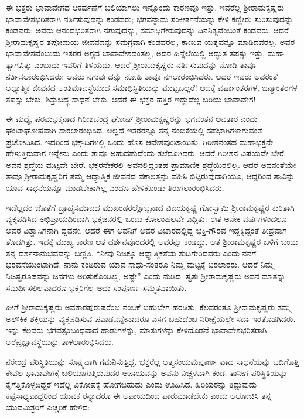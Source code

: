 ಈ ಭಕ್ತರು ಭಾವಾವೇಗದ ಆಕರ್ಷಣೆಗೆ ಬಲಿಯಾಗಲು ಇನ್ನೊಂದು ಕಾರಣವೂ ಇತ್ತು. ಇವರೆಲ್ಲ ಶ್ರೀರಾಮಕೃಷ್ಣರು ಭಾವಾವೇಶಭರಿತರಾಗಿ ನರ್ತಿಸುವುದನ್ನು ಕಂಡವರು; ಭಗವನ್ನಾಮ ಸಂಕೀರ್ತನೆಯನ್ನು ಕೇಳಿ ಕಣ್ಣೀರು ಸುರಿಸುವುದನ್ನು ಕಂಡವರು; ಅವರು ಆನಂದಭರಿತರಾಗಿ ನಗುವುದನ್ನು, ಸಮಾಧಿಗೇರುವುದನ್ನು ದಿನನಿತ್ಯವೆಂಬಂತೆ ಕಂಡವರು. ಆದರೆ ಶ್ರೀರಾಮಕೃಷ್ಣರ ತಪೋಮಯ ಜೀವನವನ್ನು ಸಮಗ್ರವಾಗಿ ಕಂಡವರಲ್ಲ, ಕಾಣುವ ಯತ್ನವನ್ನೂ ಮಾಡಿದವರಲ್ಲ. ಅವರ ಭಾವಾವೇಶವೆಂಬುದು ಇತರರ ಅಗ್ಗದ ಭಾವಾವೇಶದಂತಲ್ಲ, ಅದರ ಹಿನ್ನೆಲೆಯಲ್ಲಿ ಅದ್ಭುತ ತಪಸ್ಸು ಇತ್ತು, ಮಹಾ ತ್ಯಾಗವಿತ್ತು ಎಂಬುದು ಇವರಿಗೆ ತಿಳಿಯದು. ಆದರೆ ಶ್ರೀರಾಮಕೃಷ್ಣರು ನರ್ತಿಸುವುದನ್ನು ನೋಡಿ ತಾವೂ ನರ್ತಿಸಲಾರಂಭಿಸಿದರು; ಅವರು ನಗುವು ದನ್ನು ನೋಡಿ ತಾವೂ ನಗಲಾರಂಭಿಸಿದರು. ಆದರೆ ಇವರು ಅವರಂತೆ ಆಧ್ಯಾತ್ಮಿಕ ಜೀವನದ ಅಂತಿಮಾವಸ್ಥೆಯಾದ ಸಮಾಧಿಸ್ಥಿತಿಯನ್ನು ಮುಟ್ಟಬಲ್ಲರೆ! ಅದಕ್ಕೆ ವರ್ಷಾಂತರಗಳ, ಜನ್ಮಾಂತರಗಳ ತಪಸ್ಸು ಬೇಕು, ಶಿಸ್ತುಬದ್ಧ ಸಾಧನೆ ಬೇಕು. ಆದರೆ ಈ ಭಕ್ತರ ಹತ್ತಿರ ಇದ್ದುದೆಲ್ಲ ಬರಿಯ ಭಾವಾವೇಗ!

ಈ ಮಧ್ಯೆ, ಪರಮಭಕ್ತನಾದ ಗಿರೀಶಚಂದ್ರ ಘೋಷ್ ಶ್ರೀರಾಮಕೃಷ್ಣರನ್ನು ಭಗವಂತನ ಅವತಾರ ಎಂದು ಘಂಟಾಘೋಷವಾಗಿ ಸಾರಲಾರಂಭಿಸಿದ. ಅಲ್ಲದೆ ಇತರರನ್ನೂ ತನ್ನ ನಂಬಿಕೆಯಲ್ಲಿ ಸಹಭಾಗಿಗಳಾಗುವಂತೆ ಪ್ರಚೋದಿಸಿದ. ಇದರಿಂದ ಭಕ್ತಾದಿಗಳಲ್ಲಿ ಒಂದು ಹೊಸ ಆವೇಶವುಂಟಾಯಿತು. ಗಿರೀಶನಂತಹ ಮಹಾಭಕ್ತನೇ ಹೇಳುತ್ತಿರುವಾಗ ಇನ್ನೇನು ಎಂದು ತಾವೂ ಅಹುದಹುದೆಂದು ತಲೆದೂಗಿದರು. ಆದರೆ ಗಿರೀಶನ ವಿಷಯವೇ ಬೇರೆ. ಅವನ ಶ್ರದ್ಧೆಯ ಮಟ್ಟವೇ ಬೇರೆ. ಭಕ್ತರನೇಕರಲ್ಲಿ ಅವನಲ್ಲಿದ್ದಂತಹ ಪ್ರಾಮಾಣಿಕ ಶ್ರದ್ಧೆಯಿರಲಿಲ್ಲ. ಆದರೆ ಅವನಂತೆಯೇ ತಾವೂ ಶ್ರೀರಾಮಕೃಷ್ಣರಿಗೆ ತಮ್ಮ ಆಧ್ಯಾತ್ಮಿಕ ಜೀವನದ ವಕಾಲತ್ತನ್ನು ವಹಿಸಿ ಬಿಟ್ಟಿರುವುದಾಗಿಯೂ, ಆದ್ದರಿಂದ ತಾವಿನ್ನು ಯಾವ ಸಾಧನೆಯನ್ನೂ ಮಾಡಬೇಕಾಗಿಲ್ಲ ಎಂದೂ ಹೇಳಿಕೊಂಡು ತಿರುಗಲಾರಂಭಿಸಿದರು.

ಇದೆಲ್ಲದರ ಜೊತೆಗೆ ಬ್ರಾಹ್ಮಸಮಾಜದ ಮುಖಂಡರಲ್ಲೊಬ್ಬನಾದ ವಿಜಯಕೃಷ್ಣ ಗೋಸ್ವಾಮಿ ಶ್ರೀರಾಮಕೃಷ್ಣರ ಕುರಿತಾಗಿ ವ್ಯಕ್ತಪಡಿಸಿದ ಅಭಿಪ್ರಾಯದಿಂದಾಗಿ ಭಕ್ತಜನರಲ್ಲಿ ಒಂದು ಕೋಲಾಹಲವೇ ಎದ್ದಿತು. ಈತ ಅನೇಕ ವರ್ಷಗಳಿಂದಲೂ ಅವರ ವಿಶ್ವಾಸಿಗನಾಗಿ ದ್ದವನೇ. ಆದರೆ ಈಗ ಅವನಿಗೆ ಅವರ ವಿಚಾರದಲ್ಲಿದ್ದ ಭಕ್ತಿ-ಗೌರವ ಇದ್ದಕ್ಕಿದ್ದಂತೆ ತೀವ್ರವಾಗ ತೊಡಗಿತ್ತು. ಇದಕ್ಕೆ ಮುಖ್ಯ ಕಾರಣ ಆತ ದರ್ಶನವೊಂದರಲ್ಲಿ ಅವರನ್ನು ಕಂಡದ್ದು. ಆತ ಶ್ರೀರಾಮಕೃಷ್ಣರ ಬಳಿಗೆ ಬಂದು ತನ್ನ ದರ್ಶನಾನುಭವವನ್ನು ಬಣ್ಣಿಸಿ, “ನೀವು ನಿಜಕ್ಕೂ ಆಧ್ಯಾತ್ಮಿಕತೆಯ ತುದಿಗೇರಿದವರು ಎಂದು ನನಗೆ ಭರವಸೆಯುಂಟಾಗಿದೆ. ನಾನು ಕಂಡಿರುವ ಯಾವ ಸಾಧು-ಸಂತರೂ ನಿಮ್ಮ ಮಟ್ಟಕ್ಕೆ ಬರಲಾರರು. ಆದರೆ ನಿಮ್ಮ ನಿಜಸ್ವರೂಪವನ್ನು ಜನಗಳು ಅರಿತುಕೊಂಡಿಲ್ಲ, ಅಷ್ಟೇ” ಎಂದು ನುಡಿದ. ಸ್ವತಃ ಶ್ರೀರಾಮಕೃಷ್ಣರು ಅವನ ಮಾತನ್ನು ಸಮರ್ಥಿಸಲಿಲ್ಲವಾದರೂ ಭಕ್ತರಿಗೆಲ್ಲ ಅದು ಸಂಪೂರ್ಣ ಸಮ್ಮತವಾಯಿತು.

ಹೀಗೆ ಶ್ರೀರಾಮಕೃಷ್ಣರು ಅವತಾರಪುರುಷರೆಂಬ ನಂಬಿಕೆ ಬಹುಬೇಗ ಹರಡಿತು. ಕೆಲವರಂತೂ ಶ್ರೀರಾಮಕೃಷ್ಣರು ತಮ್ಮ ಅಲೌಕಿಕ ಶಕ್ತಿಯನ್ನು ವ್ಯಕ್ತಪಡಿಸುವ ಪವಾಡವನ್ನೇನಾದರೂ ಎಸಗ ಬಹುದೆಂಬ ನಿರೀಕ್ಷೆಯಲ್ಲೇ ಸದಾ ಇರತೊಡಗಿದರು. ಇನ್ನು ಕೆಲವರು ಭಗವತ್ಸಂಬಂಧವಾದ ಹಾಡುಗಳನ್ನು, ಮಾತುಗಳನ್ನು ಕೇಳಿದೊಡನೆ ಭಾವಾವೇಶಭರಿತರಾಗಿ ಅರೆಪ್ರಜ್ಞಾವಸ್ಥೆಯನ್ನು ತಾಳಲಾರಂಭಿಸಿದರು.

ನರೇಂದ್ರ ಪರಿಸ್ಥಿತಿಯನ್ನು ಸೂಕ್ಷ್ಮವಾಗಿ ಗಮನಿಸುತ್ತಿದ್ದ. ಭಕ್ತರೆಲ್ಲ ಆತ್ಮಸಂಯಮಪೂರ್ಣ ವಾದ ಸಾಧನೆಯನ್ನು ಬದಿಗೊತ್ತಿ ಕೇವಲ ಭಾವಾವೇಗಕ್ಕೆ ಬಲಿಯಾಗುತ್ತಿರುವುದರ ಅಪಾಯವನ್ನು ಅವನು ನಿಚ್ಚಳವಾಗಿ ಕಂಡ. ತಾನೀಗ ಪರಿಸ್ಥಿತಿಯನ್ನು ಕೈಗೆತ್ತಿಕೊಳ್ಳದಿದ್ದರೆ ಇದೆಲ್ಲ ವಿಕೋಪಕ್ಕೆ ಹೋಗಬಹುದು ಎಂದು ಊಹಿಸಿದ. ಹಿರಿಯರನ್ನು ತಿದ್ದುವುದು ಕಷ್ಟಸಾಧ್ಯವಾದ್ದರಿಂದ ಯುವಕ ರನ್ನಾದರೂ ಈ ಅಪಾಯದಿಂದ ಪಾರುಮಾಡಬೇಕು ಎಂದು ಆಲೋಚಿಸಿ ತನ್ನ ಯುವಮಿತ್ರರಿಗೆ ಎಚ್ಚರಿಕೆ ಹೇಳಿದ:

